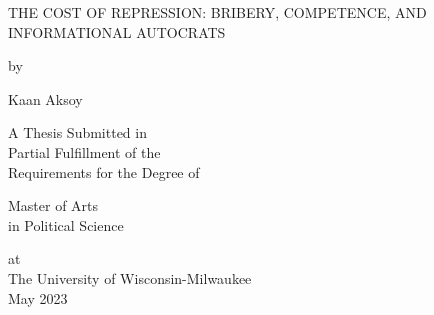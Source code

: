 \thispagestyle{empty}
   \begin{center}
       \vspace*{1cm}

       THE COST OF REPRESSION: BRIBERY, COMPETENCE, AND INFORMATIONAL AUTOCRATS
            
       \vspace{1.5cm}
       
       by
       
       \vspace{1.5cm}

       Kaan Aksoy
       \vfill
            
       A Thesis Submitted in\\
       Partial Fulfillment of the\\
       Requirements for the Degree of
       
       \vspace{2cm}
       
       Master of Arts\\
       in Political Science
                   
       \vspace{0.8cm}
       
       at\\
       The University of Wisconsin-Milwaukee\\
       May 2023
            
   \end{center}
